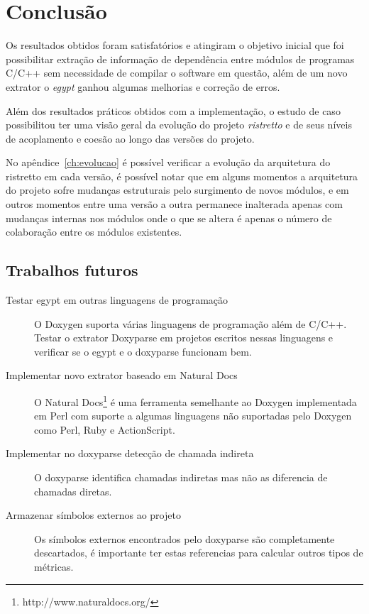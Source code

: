 \chapter{Conclusão} \label{ch:conclusao}

Os resultados obtidos foram satisfatórios e atingiram o objetivo inicial que
foi possibilitar extração de informação de dependência entre módulos de
programas C/C++ sem necessidade de compilar o software em questão, além de um
novo extrator o {\it egypt} ganhou algumas melhorias e correção de erros.

Além dos resultados práticos obtidos com a implementação, o estudo de caso
possibilitou ter uma visão geral da evolução do projeto {\it ristretto} e de
seus níveis de acoplamento e coesão ao longo das versões do projeto.

No apêndice~\ref{ch:evolucao} é possível verificar a evolução da arquitetura do
ristretto em cada versão, é possível notar que em alguns momentos a arquitetura
do projeto sofre mudanças estruturais pelo surgimento de novos módulos, e em
outros momentos entre uma versão a outra permanece inalterada apenas com
mudanças internas nos módulos onde o que se altera é apenas o número de
colaboração entre os módulos existentes.

\section{Trabalhos futuros}

\begin{description}

\item[Testar egypt em outras linguagens de programação]
O Doxygen suporta várias linguagens de programação além de C/C++. Testar o
extrator Doxyparse em projetos escritos nessas linguagens e verificar se o
egypt e o doxyparse funcionam bem.

\item[Implementar novo extrator baseado em Natural Docs]
O Natural Docs\footnote{http://www.naturaldocs.org/} é uma ferramenta
semelhante ao Doxygen implementada em Perl com suporte a algumas linguagens não
suportadas pelo Doxygen como Perl, Ruby e ActionScript.

\item[Implementar no doxyparse detecção de chamada indireta]
O doxyparse identifica chamadas indiretas mas não as diferencia de chamadas
diretas.

\item[Armazenar símbolos externos ao projeto]
Os símbolos externos encontrados pelo doxyparse são completamente descartados,
é importante ter estas referencias para calcular outros tipos de métricas.

\end{description}
